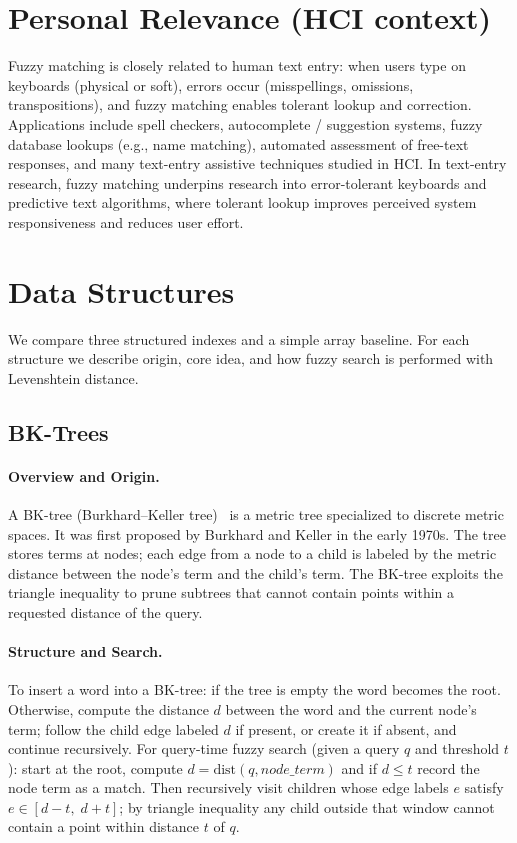 \documentclass[acmsmall,screen, nonacm]{acmart}
\begin{document}
\section{Personal Relevance (HCI context)}
Fuzzy matching is closely related to human text entry: when users type on keyboards (physical or soft), errors occur (misspellings, omissions, transpositions), and fuzzy matching enables tolerant lookup and correction. Applications include spell checkers, autocomplete / suggestion systems, fuzzy database lookups (e.g., name matching), automated assessment of free-text responses, and many text-entry assistive techniques studied in HCI. In text-entry research, fuzzy matching underpins research into error-tolerant keyboards and predictive text algorithms, where tolerant lookup improves perceived system responsiveness and reduces user effort.

\section{Data Structures}
We compare three structured indexes and a simple array baseline. For each structure we describe origin, core idea, and how fuzzy search is performed with Levenshtein distance.

\subsection{BK-Trees}
\paragraph{Overview and Origin.}
A BK-tree (Burkhard--Keller tree)~\cite{wikipediaBKtreeWikipedia} is a metric tree specialized to discrete metric spaces. It was first proposed by Burkhard and Keller in the early 1970s. The tree stores terms at nodes; each edge from a node to a child is labeled by the metric distance between the node's term and the child's term. The BK-tree exploits the triangle inequality to prune subtrees that cannot contain points within a requested distance of the query.

\paragraph{Structure and Search.}
To insert a word into a BK-tree: if the tree is empty the word becomes the root. Otherwise, compute the distance $d$ between the word and the current node's term; follow the child edge labeled $d$ if present, or create it if absent, and continue recursively. For query-time fuzzy search (given a query $q$ and threshold $t$): start at the root, compute $d=\mathrm{dist}(q, node\_term)$ and if $d\le t$ record the node term as a match. Then recursively visit children whose edge labels $e$ satisfy $e\in [d - t,\; d + t]$; by triangle inequality any child outside that window cannot contain a point within distance $t$ of $q$.
\end{document}
